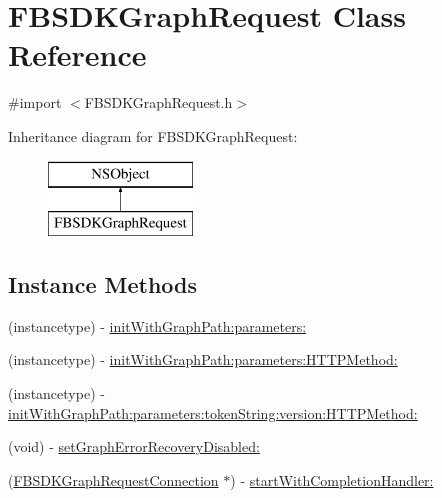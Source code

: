 \hypertarget{interface_f_b_s_d_k_graph_request}{}\section{F\+B\+S\+D\+K\+Graph\+Request Class Reference}
\label{interface_f_b_s_d_k_graph_request}


{\ttfamily \#import $<$F\+B\+S\+D\+K\+Graph\+Request.\+h$>$}

Inheritance diagram for F\+B\+S\+D\+K\+Graph\+Request\+:\begin{figure}[H]
\begin{center}
\leavevmode
\includegraphics[height=2.000000cm]{interface_f_b_s_d_k_graph_request}
\end{center}
\end{figure}
\subsection*{Instance Methods}
\begin{DoxyCompactItemize}
\item 
(instancetype) -\/ \hyperlink{interface_f_b_s_d_k_graph_request_a0d2545a6264377a1f51aec7da411c0f6}{init\+With\+Graph\+Path\+:parameters\+:}
\item 
(instancetype) -\/ \hyperlink{interface_f_b_s_d_k_graph_request_a20fe5c18d67699e74e9596058552aa6a}{init\+With\+Graph\+Path\+:parameters\+:\+H\+T\+T\+P\+Method\+:}
\item 
(instancetype) -\/ \hyperlink{interface_f_b_s_d_k_graph_request_a1ab42a8e70025f6f6c6c61b31c35480f}{init\+With\+Graph\+Path\+:parameters\+:token\+String\+:version\+:\+H\+T\+T\+P\+Method\+:}
\item 
(void) -\/ \hyperlink{interface_f_b_s_d_k_graph_request_aa1a0db7fc5b93d4014fb9922580a02eb}{set\+Graph\+Error\+Recovery\+Disabled\+:}
\item 
(\hyperlink{interface_f_b_s_d_k_graph_request_connection}{F\+B\+S\+D\+K\+Graph\+Request\+Connection} $\ast$) -\/ \hyperlink{interface_f_b_s_d_k_graph_request_a72aac56d84e54366ae37cbc05353fcc0}{start\+With\+Completion\+Handler\+:}
\end{DoxyCompactItemize}
